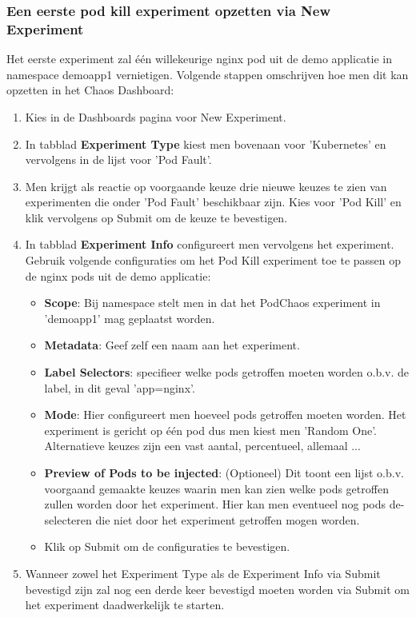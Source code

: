 \subsubsection{Een eerste pod kill experiment opzetten via New Experiment} 

Het eerste experiment zal één willekeurige nginx pod uit de demo applicatie in namespace demoapp1 vernietigen. Volgende stappen omschrijven hoe men dit kan opzetten in het Chaos Dashboard: 
\begin{enumerate}
    \item Kies in de Dashboards pagina voor New Experiment. 
    \item In tabblad {\bf Experiment Type} kiest men bovenaan voor 'Kubernetes' en vervolgens in de lijst voor 'Pod Fault'. 
    \item Men krijgt als reactie op voorgaande keuze drie nieuwe keuzes te zien van experimenten die onder 'Pod Fault' beschikbaar zijn. Kies voor 'Pod Kill' en klik vervolgens op Submit om de keuze te bevestigen.
    \item In tabblad {\bf Experiment Info} configureert men vervolgens het experiment. Gebruik volgende configuraties om het Pod Kill experiment toe te passen op de nginx pods uit de demo applicatie:
        \begin{itemize}
            \item {\bf Scope}: Bij namespace stelt men in dat het PodChaos experiment in 'demoapp1' mag geplaatst worden.
            \item {\bf Metadata}: Geef zelf een naam aan het experiment.
            \item {\bf Label Selectors}: specifieer welke pods getroffen moeten worden o.b.v. de label, in dit geval 'app=nginx'.
            \item {\bf Mode}: Hier configureert men hoeveel pods getroffen moeten worden. Het experiment is gericht op één pod dus men kiest men 'Random One'. Alternatieve keuzes zijn een vast aantal, percentueel, allemaal ...
            \item {\bf Preview of Pods to be injected}: (Optioneel) Dit toont een lijst o.b.v. voorgaand gemaakte keuzes waarin men kan zien welke pods getroffen zullen worden door het experiment. Hier kan men eventueel nog pods de-selecteren die niet door het experiment getroffen mogen worden.
            \item Klik op Submit om de configuraties te bevestigen.
        \end{itemize}
    \item Wanneer zowel het Experiment Type als de Experiment Info via Submit bevestigd zijn zal nog een derde keer bevestigd moeten worden via Submit om het experiment daadwerkelijk te starten.
\end{enumerate}

